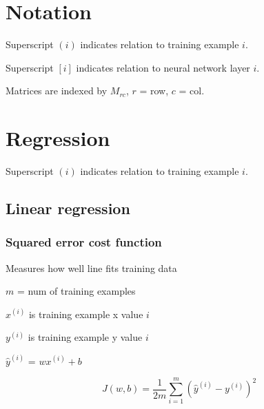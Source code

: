 \documentclass[12pt]{article}
\begin{document}
\newcommand*\dif{\mathop{}\!\mathrm{d}}


\newenvironment{subitemize}
{ \begin{itemize}[leftmargin=\parindent] }
{ \end{itemize} }

\newenvironment{subenumerate}
{ \begin{enumerate}[leftmargin=\parindent] }
{ \end{enumerate} }

\tableofcontents


\pagebreak

\section{Notation}

Superscript $(i)$ indicates relation to training example $i$.

Superscript $[i]$ indicates relation to neural network layer $i$.

Matrices are indexed by $M_{rc}$, $r$ = row, $c$ = col.

\section{Regression}

Superscript $(i)$ indicates relation to training example $i$.

\subsection{Linear regression}
\subsubsection{Squared error cost function}

Measures how well line fits training data

$m$ = num of training examples

$x^{(i)}$ is training example x value $i$

$y^{(i)}$ is training example y value $i$

$\hat y^{(i)}$ = $wx^{(i)} + b$

\[ J(w,b) = \frac{1}{2m} \sum_{i=1}^m ({\hat y}^{(i)} - y^{(i)})^2 \]
\end{document}
